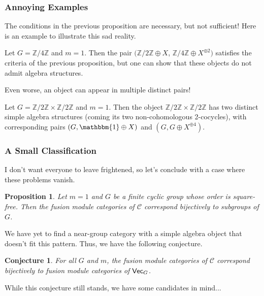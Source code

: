 \documentclass{beamer}
\theoremstyle{plain}
\newtheorem{proposition}[theorem]{Proposition}
\newtheorem{conjecture}[theorem]{Conjecture}
\theoremstyle{definition}
\DeclarePairedDelimiter{\abs}{\lvert}{\rvert}
\newcommand{\mathcat}[1]{\mathcal{#1}}
\newcommand{\textcat}[1]{\textup{\textsf{#1}}}
\begin{document}
\begin{frame}
\frametitle{Annoying Examples}
The conditions in the previous proposition are necessary, but not sufficient! Here is an example to illustrate this sad reality.
\begin{example}
Let $G = \mathbb{Z}/4\mathbb{Z}$ and $m = 1$. Then the pair $(\mathbb{Z}/2\mathbb{Z} \oplus X$, $\mathbb{Z}/4\mathbb{Z} \oplus X^{\oplus 2})$ satisfies the criteria of the previous proposition, but one can show that these objects do not admit algebra structures.
\end{example}
Even worse, an object can appear in multiple distinct pairs!
\begin{example}
Let $G = \mathbb{Z}/2\mathbb{Z} \times \mathbb{Z}/2\mathbb{Z}$ and $m = 1$. Then the object $\mathbb{Z}/2\mathbb{Z} \times \mathbb{Z}/2\mathbb{Z}$ has two distinct simple algebra structures (coming its two non-cohomologous 2-cocycles), with corresponding pairs $(G, \mathbbm{1} \oplus X)$ and $(G, G \oplus X^{\oplus 4})$.
\end{example}
\end{frame}

\begin{frame}
\frametitle{A Small Classification}
I don't want everyone to leave frightened, so let's conclude with a case where these problems vanish.
\begin{proposition}
Let $m = 1$ and $G$ be a finite cyclic group whose order is square-free. Then the fusion module categories of $\mathcat{C}$ correspond bijectively to subgroups of $G$.
\end{proposition}
We have yet to find a near-group category with a simple algebra object that doesn't fit this pattern. Thus, we have the following conjecture.
\begin{conjecture}
For all $G$ and $m$, the fusion module categories of $\mathcat{C}$ correspond bijectively to fusion module categories of $\textcat{Vec}_G$.
\end{conjecture}
While this conjecture still stands, we have some candidates in mind...
\end{frame}

\end{document}
